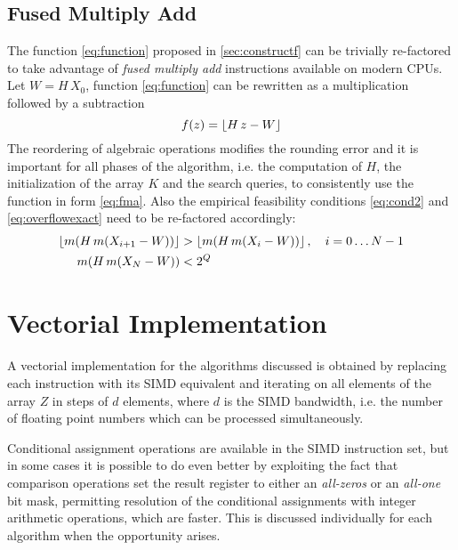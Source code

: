 \documentclass[preprint,1p,times]{elsarticle}
\begin{document}
\subsection{Fused Multiply Add}
The function \eqref{eq:function} proposed in \ref{sec:constructf} can be trivially re-factored to take advantage of \textit{fused multiply add} instructions available on modern CPUs. Let $W=H\, X_0$, function \eqref{eq:function} can be rewritten as a multiplication followed by a subtraction
\begin{equation}
\label{eq:fma}
   f(z) =\left \lfloor H \, z-W \right \rfloor
\end{equation}
The reordering of algebraic operations modifies the rounding error and it is important for all phases of the algorithm, i.e. the computation of $H$, the initialization of the array $K$ and the search queries, to consistently use the function in form \eqref{eq:fma}. Also the empirical feasibility conditions \eqref{eq:cond2} and \eqref{eq:overflowexact} need to be re-factored accordingly:
\begin{align*}
	\left \lfloor m(H\,m(X_{i+1}-W)) \right \rfloor &> \left \lfloor m(H\,m(X_{i}-W)) \right \rfloor,   \quad i=0\dots N-1 \\
	m(H\,m(X_{N}-W)) &< 2^Q
\end{align*}

\section{Vectorial Implementation}
\label{sec:vectorialimpl}


A vectorial implementation for the algorithms discussed is obtained by replacing each instruction with its SIMD equivalent and iterating on all elements of the array $Z$ in steps of $d$ elements, where $d$ is the SIMD bandwidth, i.e. the number of floating point numbers which can be processed simultaneously.

Conditional assignment operations are available in the SIMD instruction set, but in some cases it is possible to do even better by exploiting the fact that comparison operations set the result register to either an \textit{all-zeros} or an \textit{all-one} bit mask, permitting resolution of the conditional assignments with integer arithmetic operations, which are faster. This is discussed individually for each algorithm when the opportunity arises.
\end{document}
